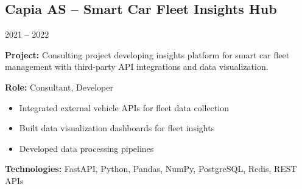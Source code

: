 \documentclass[10pt, a4paper]{article}
\begin{document}
\subsection*{Capia AS -- Smart Car Fleet Insights Hub}
{\small\color{lightgray}2021 -- 2022}

{\small
\textbf{Project:} Consulting project developing insights platform for smart car fleet management with third-party API integrations and data visualization.

\textbf{Role:} Consultant, Developer

\begin{itemize}[noitemsep, leftmargin=1.2em, topsep=0.2em]
    \item Integrated external vehicle APIs for fleet data collection
    \item Built data visualization dashboards for fleet insights
    \item Developed data processing pipelines
\end{itemize}

\textbf{Technologies:} FastAPI, Python, Pandas, NumPy, PostgreSQL, Redis, REST APIs
}
\end{document}
